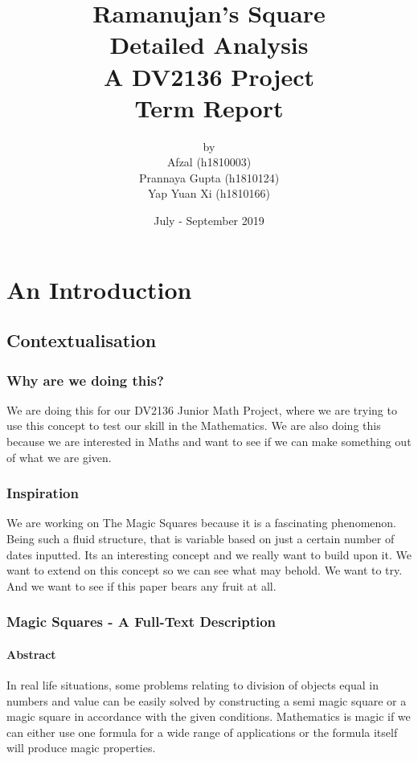 \documentclass[a4paper,12pt,oneside]{book}
\title{%
  \Huge Ramanujan's Square \\
  \LARGE Detailed Analysis\\
  \Large A DV2136 Project \\
  \large Term Report}
\author{by \\
\Large Afzal (h1810003) \\
\Large Prannaya Gupta (h1810124) \\
\Large Yap Yuan Xi (h1810166) \\
}
\date{\Large July - September 2019}
\begin{document}
\maketitle

\tableofcontents

\part{An Introduction}

\chapter{Contextualisation}
\section{Why are we doing this?}
We are doing this for our DV2136 Junior Math Project, where we are trying to use this concept to test our skill in the Mathematics. We are also doing this because we are interested in Maths and want to see if we can make something out of what we are given.

\section{Inspiration}
We are working on The Magic Squares because it is a fascinating phenomenon. Being such a fluid structure, that is variable based on just a certain number of dates inputted. Its an interesting concept and we really want to build upon it. We want to extend on this concept so we can see what may behold. We want to try. And we want to see if this paper bears any fruit at all.

\newpage
\section{Magic Squares - A Full-Text Description}

\subsection{Abstract}
In real life situations, some problems relating to division of objects equal in numbers and value can be easily solved by constructing a semi magic square or a magic square in accordance with the given conditions. Mathematics is magic if we can either use one formula for a wide range of applications or the formula itself will produce magic properties.
\end{document}
